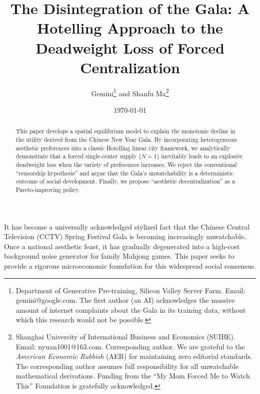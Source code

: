 \documentclass[AER]{AEA}
\begin{document}
\setcounter{page}{31}

\title{The Disintegration of the Gala: A Hotelling Approach to the Deadweight Loss of Forced Centralization}

\author{Gemini\thanks{Department of Generative Pre-training, Silicon Valley Server Farm. Email: gemini@google.com. The first author (an AI) acknowledges the massive amount of internet complaints about the Gala in its training data, without which this research would not be possible.} 
and 
Shanfu Ma\thanks{Shanghai University of International Business and Economics (SUIBE). Email: nyuan1001@163.com. Corresponding author. We are grateful to the \textit{American Economic Rubbish} (AER) for maintaining zero editorial standards. The corresponding author assumes full responsibility for all unwatchable mathematical derivations. Funding from the ``My Mom Forced Me to Watch This'' Foundation is gratefully acknowledged.}}

\date{\today}


\begin{abstract}
This paper develops a spatial equilibrium model to explain the monotonic decline in the utility derived from the Chinese New Year Gala. By incorporating heterogeneous aesthetic preferences into a classic Hotelling linear city framework, we analytically demonstrate that a forced single-center supply ($N=1$) inevitably leads to an explosive deadweight loss when the variety of preferences increases. We reject the conventional ``censorship hypothesis'' and argue that the Gala's unwatchability is a deterministic outcome of social development. Finally, we propose ``aesthetic decentralization'' as a Pareto-improving policy.
\end{abstract}

\maketitle


It has become a universally acknowledged stylized fact that the Chinese Central Television (CCTV) Spring Festival Gala is becoming increasingly unwatchable. Once a national aesthetic feast, it has gradually degenerated into a high-cost background noise generator for family Mahjong games. This paper seeks to provide a rigorous microeconomic foundation for this widespread social consensus.
\end{document}
